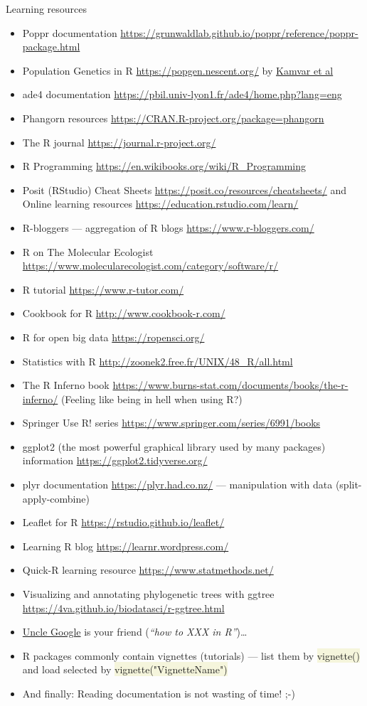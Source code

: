 \documentclass[compress, xelatex, 11pt, xcolor=svgnames, aspectratio=169,
	hyperref={
		bookmarks=true,
		unicode=true,
		colorlinks=true,
		pdftitle={Molecular data in R},
		plainpages=false,
		pdfauthor={Vojtech Zeisek},
		pdfsubject={Course about phylogeny and evolution in R},
		pdfcreator={XeLaTeX},
		pdfkeywords={R, evolution, phylogeny, molecular data},
		linkcolor=Crimson, %
		anchorcolor=Magenta, %
		citecolor=Magenta, %
		filecolor=Magenta, %
		menucolor=Magenta, %
		urlcolor=DodgerBlue, %
		},
	url={hyphens, lowtilde} %
	]{beamer}
\renewcommand{\texttt}[1]{\colorbox{Beige}{{\ttfamily #1}}}
\begin{document}
\begin{frame}[allowframebreaks]{Learning resources}
\begin{itemize}
		\item Poppr documentation \url{https://grunwaldlab.github.io/poppr/reference/poppr-package.html}
		\item Population Genetics in R \url{https://popgen.nescent.org/} by \href{https://onlinelibrary.wiley.com/doi/full/10.1111/1755-0998.12558}{Kamvar et al}
		\item ade4 documentation \url{https://pbil.univ-lyon1.fr/ade4/home.php?lang=eng}
		\item Phangorn resources \url{https://CRAN.R-project.org/package=phangorn}
		\item The R journal \url{https://journal.r-project.org/}
		\item R Programming \url{https://en.wikibooks.org/wiki/R_Programming}
		\item Posit (RStudio) Cheat Sheets \url{https://posit.co/resources/cheatsheets/} and Online learning resources \url{https://education.rstudio.com/learn/}
		\item R-bloggers --- aggregation of R blogs \url{https://www.r-bloggers.com/}
		\item R on The Molecular Ecologist \url{https://www.molecularecologist.com/category/software/r/}
		\item R tutorial \url{https://www.r-tutor.com/}
		\item Cookbook for R  \url{http://www.cookbook-r.com/}
		\item R for open big data \url{https://ropensci.org/}
		\item Statistics with R \url{http://zoonek2.free.fr/UNIX/48_R/all.html}
		\item The R Inferno book \url{https://www.burns-stat.com/documents/books/the-r-inferno/} (Feeling like being in hell when using R?)
		\item Springer Use R! series \url{https://www.springer.com/series/6991/books}
		\item ggplot2 (the most powerful graphical library used by many packages) information \url{https://ggplot2.tidyverse.org/}
		\item plyr documentation \url{https://plyr.had.co.nz/} --- manipulation with data (split-apply-combine)
		\item Leaflet for R \url{https://rstudio.github.io/leaflet/}
		\item Learning R blog \url{https://learnr.wordpress.com/}
		\item Quick-R learning resource \url{https://www.statmethods.net/}
		\item Visualizing and annotating phylogenetic trees with ggtree \url{https://4va.github.io/biodatasci/r-ggtree.html}
		\item \href{https://rseek.org/}{Uncle Google} is your friend (\textit{\enquote{how to XXX in R}})\ldots
		\item R packages commonly contain vignettes (tutorials) --- list them by \texttt{vignette()} and load selected by \texttt{vignette("VignetteName")}
		\item And finally: \alert{Reading documentation is not wasting of time!} ;-)
	\end{itemize}
\end{frame}
\end{document}
